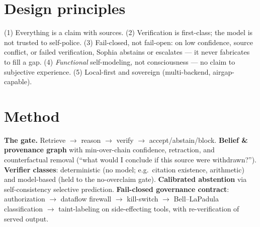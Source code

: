 \documentclass[11pt]{article}
\begin{document}
\section{Design principles}
(1) Everything is a claim with sources. (2) Verification is first-class; the model is not trusted
to self-police. (3) Fail-closed, not fail-open: on low confidence, source conflict, or failed
verification, Sophia abstains or escalates --- it never fabricates to fill a gap.
(4) \emph{Functional} self-modeling, not consciousness --- no claim to subjective experience.
(5) Local-first and sovereign (multi-backend, airgap-capable).

\section{Method}
\textbf{The gate.} Retrieve $\rightarrow$ reason $\rightarrow$ verify $\rightarrow$
accept/abstain/block. \textbf{Belief \& provenance graph} with min-over-chain confidence,
retraction, and counterfactual removal (``what would I conclude if this source were withdrawn?'').
\textbf{Verifier classes}: deterministic (no model; e.g.\ citation existence, arithmetic) and
model-based (held to the no-overclaim gate). \textbf{Calibrated abstention} via self-consistency
selective prediction. \textbf{Fail-closed governance contract}: authorization $\rightarrow$
dataflow firewall $\rightarrow$ kill-switch $\rightarrow$ Bell--LaPadula classification
$\rightarrow$ taint-labeling on side-effecting tools, with re-verification of served output.
\end{document}
